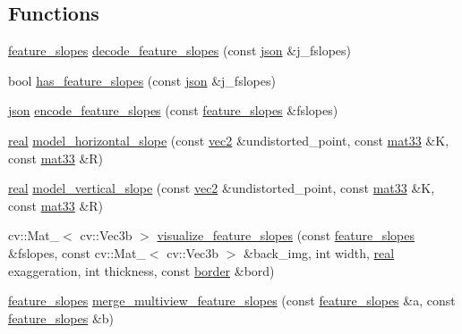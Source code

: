 \subsection*{Functions}
\begin{DoxyCompactItemize}
\item 
\hyperlink{structtlz_1_1feature__slopes}{feature\+\_\+slopes} \hyperlink{namespacetlz_a3f97cf7f503f586ab7cfa5175b5a5bf2}{decode\+\_\+feature\+\_\+slopes} (const \hyperlink{namespacetlz_ac400657dfcddf6309a769aefc23eed0c}{json} \&j\+\_\+fslopes)
\item 
bool \hyperlink{namespacetlz_a3fe6565d9058a6aacef917e7229daa27}{has\+\_\+feature\+\_\+slopes} (const \hyperlink{namespacetlz_ac400657dfcddf6309a769aefc23eed0c}{json} \&j\+\_\+fslopes)
\item 
\hyperlink{namespacetlz_ac400657dfcddf6309a769aefc23eed0c}{json} \hyperlink{namespacetlz_a96def3742b2e93e5d1da90d6083d670c}{encode\+\_\+feature\+\_\+slopes} (const \hyperlink{structtlz_1_1feature__slopes}{feature\+\_\+slopes} \&fslopes)
\item 
\hyperlink{namespacetlz_a15fd37cce97f2b8b606af18c2615f602}{real} \hyperlink{namespacetlz_ab937f017b3638fd7ae21499b9ecc3688}{model\+\_\+horizontal\+\_\+slope} (const \hyperlink{namespacetlz_ae192989bfbe6c700ac84d2a8cf05ebb4}{vec2} \&undistorted\+\_\+point, const \hyperlink{namespacetlz_a6679497d5121f319147594e1f344ef57}{mat33} \&K, const \hyperlink{namespacetlz_a6679497d5121f319147594e1f344ef57}{mat33} \&R)
\item 
\hyperlink{namespacetlz_a15fd37cce97f2b8b606af18c2615f602}{real} \hyperlink{namespacetlz_ad9e6861d0c3fa74ca4a44f379cea8d31}{model\+\_\+vertical\+\_\+slope} (const \hyperlink{namespacetlz_ae192989bfbe6c700ac84d2a8cf05ebb4}{vec2} \&undistorted\+\_\+point, const \hyperlink{namespacetlz_a6679497d5121f319147594e1f344ef57}{mat33} \&K, const \hyperlink{namespacetlz_a6679497d5121f319147594e1f344ef57}{mat33} \&R)
\item 
cv\+::\+Mat\+\_\+$<$ cv\+::\+Vec3b $>$ \hyperlink{namespacetlz_a504e67ffe264bacc884eb904ec814a80}{visualize\+\_\+feature\+\_\+slopes} (const \hyperlink{structtlz_1_1feature__slopes}{feature\+\_\+slopes} \&fslopes, const cv\+::\+Mat\+\_\+$<$ cv\+::\+Vec3b $>$ \&back\+\_\+img, int width, \hyperlink{namespacetlz_a15fd37cce97f2b8b606af18c2615f602}{real} exaggeration, int thickness, const \hyperlink{structtlz_1_1border}{border} \&bord)
\item 
\hyperlink{structtlz_1_1feature__slopes}{feature\+\_\+slopes} \hyperlink{namespacetlz_a0469df7eb30e593fb04a10aed9fbfec2}{merge\+\_\+multiview\+\_\+feature\+\_\+slopes} (const \hyperlink{structtlz_1_1feature__slopes}{feature\+\_\+slopes} \&a, const \hyperlink{structtlz_1_1feature__slopes}{feature\+\_\+slopes} \&b)

\end{DoxyCompactItemize}
